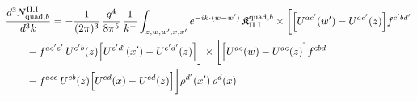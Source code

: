 \begingroup\small
\begin{align}\label{eq:H-II.I-2b}
&\frac{d^{3}N^{\rm II.I}_{{\rm quad},b}}{d^{3}k}=-\frac{1}{(2\pi)^{3}}\, \frac{g^{4}}{8\pi^{5}}\, \frac{1}{k^{+}} \int_{z,w,w',x,x'}e^{-ik\cdot(w-w')}\, \mathfrak{K}^{{\rm quad},b}_{\rm II.I} \times\bigg[\Big[U^{ac'}(w')-U^{ac'}(z)\Big]f^{c'bd'}\notag\\
&\quad\quad -f^{ac'e'}\, U^{c'b}(z)\Big[U^{e'd'}(x')-U^{e'd'}(z)\Big]\bigg] \times\bigg[\Big[U^{ac}(w)-U^{ac}(z)\Big]f^{cbd}\notag\\
&\quad\quad -f^{ace}\, U^{cb}(z)\Big[U^{ed}(x)-U^{ed}(z)\Big]\bigg]\rho^{d'}(x')\, \rho^{d}(x)
\end{align}
\endgroup
